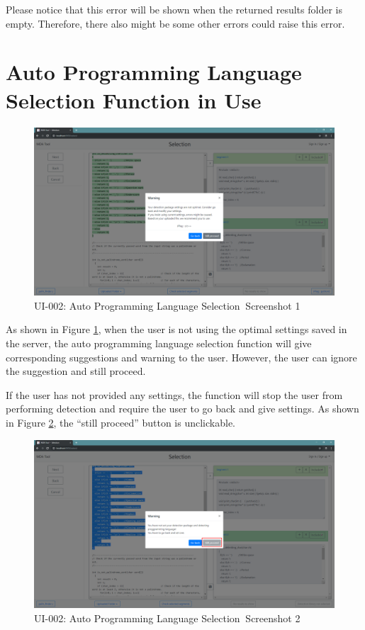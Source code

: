 \documentclass[twoside,a4paper]{refart}
\newcommand{\bugsecond}{UI-002: Auto Programming Language Selection}
\begin{document}
Please notice that this error will be shown when the returned results folder is empty. Therefore, there also might be some other errors could raise this error.

\section{Auto Programming Language Selection Function in Use} \label{bug_2_expl}

\begin{figure}[!h]
\centering
\includegraphics[width=12cm]{img/bug_2-1.png}
\caption{\bugsecond $\ $ Screenshot 1}
\label{fig:bug2_1}
\end{figure}

As shown in Figure \ref{fig:bug2_1}, when the user is not using the optimal settings saved in the server, the auto programming language selection function will give corresponding suggestions and warning to the user. However, the user can ignore the suggestion and still proceed.

If the user has not provided any settings, the function will stop the user from performing detection and require the user to go back and give settings. As shown in Figure \ref{fig:bug2_2}, the \enquote{still proceed} button is unclickable.

\clearpage

\begin{figure}[!h]
\centering
\includegraphics[width=12cm]{img/bug_2-2.png}
\caption{\bugsecond $\ $ Screenshot 2}
\label{fig:bug2_2}
\end{figure}

\printindex
\end{document}
